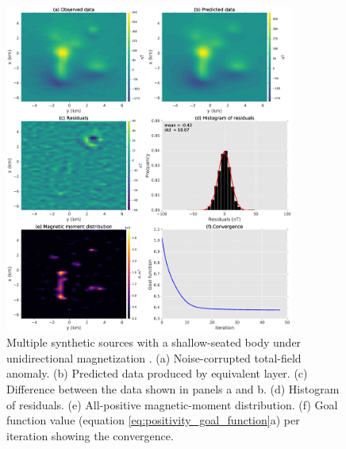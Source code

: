 \begin{figure}
	\centering
	\includegraphics[width=0.85\textwidth]{Fig/unidir_shallow_test/results_compiled_LM_NNLS_magRM.eps}
	\caption{Multiple synthetic sources with a shallow-seated body under unidirectional magnetization . (a) Noise-corrupted total-field anomaly. (b) Predicted data produced by equivalent layer. (c) Difference between the data shown in panels a and b. (d) Histogram of residuals. (e) All-positive magnetic-moment distribution. (f) Goal function value (equation \ref{eq:positivity_goal_function}a) per iteration showing the convergence.}
	\label{fig:unidir_shallow_test}
\end{figure}

